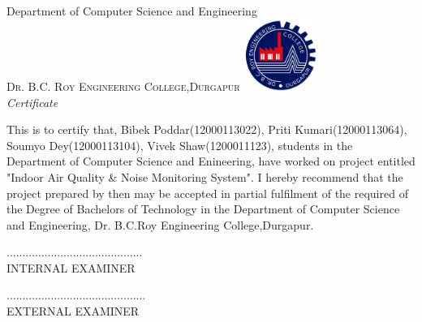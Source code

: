 \newpage
\thispagestyle{empty}

\begin{center}

\huge{Department of Computer Science and Engineering}\\[0.5cm]
\normalsize
\textsc{Dr. B.C. Roy Engineering College,Durgapur}
\vfill
\includegraphics[width=0.18\textwidth]{./logo}\\[0.1in]

\emph{\LARGE Certificate}\\[1cm]
\end{center}
\normalsize This is to certify that, Bibek Poddar(12000113022), Priti Kumari(12000113064), Soumyo Dey(12000113104), Vivek Shaw(1200011123), students in the Department of Computer Science and Enineering, have worked on project entitled "Indoor Air Quality \& Noise Monitoring System".
I hereby recommend that the project prepared by then may be accepted in partial  fulfilment of the required of the Degree of Bachelors of Technology in the Department of Computer Science and Engineering, Dr. B.C.Roy Engineering College,Durgapur.


\vfill


\begin{flushright}
...........................................\\
INTERNAL EXAMINER\\[1.5cm]
\end{flushright}
\begin{flushright}
............................................\\
EXTERNAL EXAMINER\\[1.5cm]
\end{flushright}

